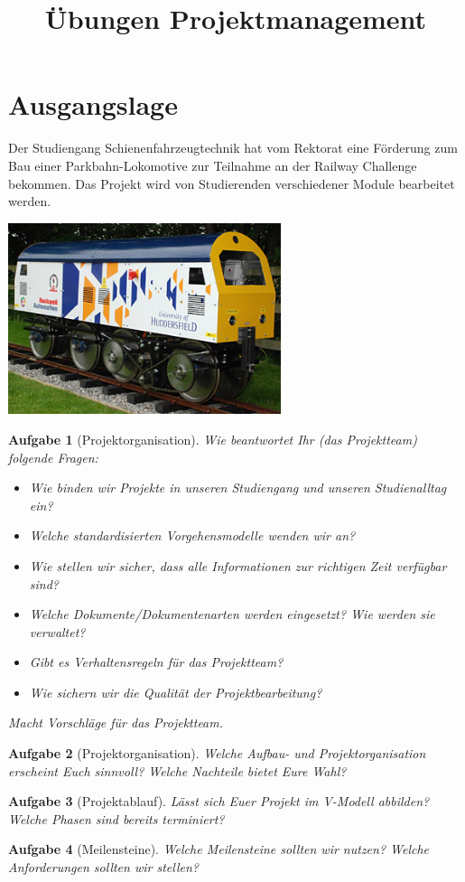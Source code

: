\documentclass[11pt,a4paper,headsepline]{scrartcl}
\title{\"Ubungen Projektmanagement}
\date{}
\newtheorem{aufgabe}{Aufgabe}
\begin{document}
\vspace{-1cm}
\maketitle
\thispagestyle{fancy}
\pagestyle{fancy}
\vspace{-2cm}

\section*{Ausgangslage}
Der Studiengang Schienenfahrzeugtechnik hat vom Rektorat eine F\"orderung zum Bau einer Parkbahn-Lokomotive zur Teilnahme an der Railway Challenge bekommen. Das Projekt wird von Studierenden verschiedener Module bearbeitet werden.
\begin{center}
\includegraphics[width = 0.6\textwidth]{Lok}
\end{center}

\begin{aufgabe}[Projektorganisation] 
Wie beantwortet Ihr (das Projektteam) folgende Fragen:
\begin{itemize}
\item Wie binden wir Projekte in unseren Studiengang und unseren Studienalltag ein?
\item Welche standardisierten Vorgehensmodelle wenden wir an?
\item Wie stellen wir sicher, dass alle Informationen zur richtigen Zeit verf\"ugbar sind?
\item Welche Dokumente/Dokumentenarten werden eingesetzt? Wie werden sie verwaltet?
\item Gibt es Verhaltensregeln f\"ur das Projektteam?
\item Wie sichern wir die Qualit\"at der Projektbearbeitung?
\end{itemize}
Macht Vorschl\"age f\"ur das Projektteam.
\end{aufgabe}

\begin{aufgabe}[Projektorganisation] 
Welche Aufbau- und Projektorganisation erscheint Euch sinnvoll? Welche Nachteile bietet Eure Wahl?
\end{aufgabe}

\begin{aufgabe}[Projektablauf] 
L\"asst sich Euer Projekt im V-Modell abbilden? Welche Phasen sind bereits terminiert?
\end{aufgabe}

\begin{aufgabe}[Meilensteine] 
Welche Meilensteine sollten wir nutzen? Welche Anforderungen sollten wir stellen?
\end{aufgabe}
\end{document}
